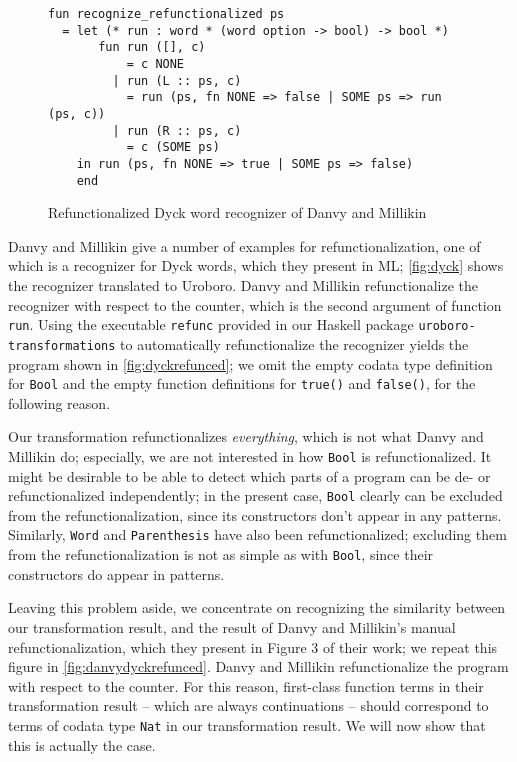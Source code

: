 \begin{figure}
\begin{lstlisting}
fun recognize_refunctionalized ps
  = let (* run : word * (word option -> bool) -> bool *)
       fun run ([], c) 
           = c NONE
         | run (L :: ps, c)
           = run (ps, fn NONE => false | SOME ps => run (ps, c))
         | run (R :: ps, c)
           = c (SOME ps)
    in run (ps, fn NONE => true | SOME ps => false)
    end
\end{lstlisting}
\caption{Refunctionalized Dyck word recognizer of Danvy and Millikin}
\label{fig:danvydyckrefunced}
\end{figure}

Danvy and Millikin\cite{danvy09refunctionalization} give a number of examples for refunctionalization, one of which is a recognizer for Dyck words, which they present in ML; \autoref{fig:dyck} shows the recognizer translated to Uroboro. Danvy and Millikin refunctionalize the recognizer with respect to the counter, which is the second argument of function \texttt{run}. Using the executable \texttt{refunc} provided in our Haskell package \texttt{uroboro-transformations} to automatically refunctionalize the recognizer yields the program shown in \autoref{fig:dyckrefunced}; we omit the empty codata type definition for \texttt{Bool} and the empty function definitions for \texttt{true()} and \texttt{false()}, for the following reason.

Our transformation refunctionalizes \textit{everything}, which is not what Danvy and Millikin do; especially, we are not interested in how \texttt{Bool} is refunctionalized. It might be desirable to be able to detect which parts of a program can be de- or refunctionalized independently; in the present case, \texttt{Bool} clearly can be excluded from the refunctionalization, since its constructors don't appear in any patterns. Similarly, \texttt{Word} and \texttt{Parenthesis} have also been refunctionalized; excluding them from the refunctionalization is not as simple as with \texttt{Bool}, since their constructors do appear in patterns.

Leaving this problem aside, we concentrate on recognizing the similarity between our transformation result, and the result of Danvy and Millikin's manual refunctionalization, which they present in Figure 3 of their work; we repeat this figure in \autoref{fig:danvydyckrefunced}. Danvy and Millikin refunctionalize the program with respect to the counter. For this reason, first-class function terms in their transformation result -- which are always continuations -- should correspond to terms of codata type \texttt{Nat} in our transformation result. We will now show that this is actually the case.

